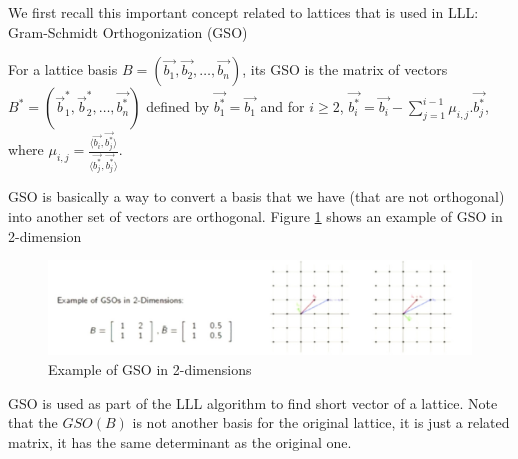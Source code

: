 We first recall this important concept related to lattices that is used in LLL:
Gram-Schmidt Orthogonization (GSO)
\begin{definition}
  [GSO] For a lattice basis
  $B = \left( \vec{b_1}, \vec{b_2}, \dots, \vec{b_n} \right)$, its GSO is the
  matrix of vectors
  $B^* = \left( \vec{b}_1^*, \vec{b}_2^*, \dots, \vec{b_n^*} \right)$ defined by
  $\vec{b_1^*} = \vec{b_1}$ and for $i \geq 2$,
  $\vec{b_i^*} = \vec{b_i} - \sum_{j=1}^{i-1}{\mu_{i,j}.\vec{b_j^*}}$, where
  $\mu_{i,j} = \frac{\langle \vec{b_i}, \vec{b_j^*} \rangle}{\langle
    \vec{b_j^*},\vec{b_j^*} \rangle}$.
  \label{def:GSO}
\end{definition}
GSO is basically a way to convert a basis that we have (that are not orthogonal)
into another set of vectors are orthogonal. Figure \ref{fig:gso} shows an
example of GSO in 2-dimension
\begin{figure}[h]
  \centering \includegraphics[scale=0.3]{gso}
  \caption{Example of GSO in 2-dimensions}
  \label{fig:gso}
\end{figure}
GSO is used as part of the LLL algorithm to find short vector of a lattice.
Note that the $GSO(B)$ is not another basis for the original lattice, it is just
a related matrix, it has the same determinant as the original one.



